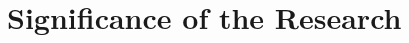 \begin{comment}
	
	Generally, one paragraph should be allotted for each of your research objectives.
	
	Each paragraph contains a brief overview of the concept/theory and the purpose of doing the associated objective.
	
	Each paragraph also includes a description of the scope/limitation of your study.
	
	* Please refer to the slides for examples.
	
\end{comment}


\section{Significance of the Research}
\label{sec:significance}

